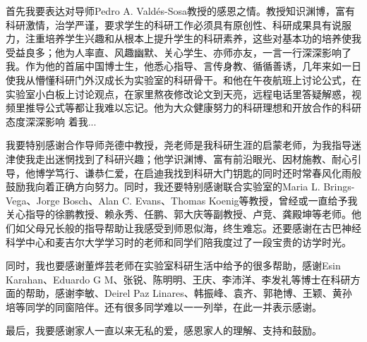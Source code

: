 \thesisacknowledgement
首先我要表达对导师Pedro A. Valdés-Sosa教授的感恩之情。教授知识渊博，富有科研激情，治学严谨，要求学生的科研工作必须具有原创性、科研成果具有说服力，注重培养学生兴趣和从根本上提升学生的科研素养，这些对基本功的培养使我受益良多；他为人率直、风趣幽默、关心学生、亦师亦友，一言一行深深影响了我。作为他的首届中国博士生，他悉心指导、言传身教、循循善诱，几年来如一日使我从懵懂科研门外汉成长为实验室的科研骨干。和他在午夜航班上讨论公式，在实验室小白板上讨论观点，在家里熬夜修改论文到天亮，远程电话里答疑解惑，视频里推导公式等都让我难以忘记。他为大众健康努力的科研理想和开放合作的科研态度深深影响
着我...

我要特别感谢合作导师尧德中教授，尧老师是我科研生涯的启蒙老师，为我指导迷津使我走出迷惘找到了科研兴趣；他学识渊博、富有前沿眼光、因材施教、耐心引导，他博学笃行、谦恭仁爱，在启迪我找到科研大门钥匙的同时还时常春风化雨般鼓励我向着正确方向努力。同时，我还要特别感谢联合实验室的Maria L. Brings-Vega、Jorge Bosch、Alan C. Evans、Thomas Koenig等教授，曾经或一直给予我关心指导的徐鹏教授、赖永秀、任鹏、郭大庆等副教授、卢竞、龚殿坤等老师。他们如父母兄长般的指导帮助让我感受到师恩似海，终生难忘。还要感谢在古巴神经科学中心和麦吉尔大学学习时的老师和同学们陪我度过了一段宝贵的访学时光。

同时，我也要感谢董烨芸老师在实验室科研生活中给予的很多帮助，感谢Esin Karahan、Eduardo G M、张锐、陈明明、王庆、李沛洋、李发礼等博士在科研方面的帮助，感谢李敏、Deirel Paz Linares、韩振峰、袁齐、郭艳博、王颖、黄孙培等同学的同窗陪伴。还有很多同学难以一一列举，在此一并表示感谢。

最后，我要感谢家人一直以来无私的爱，感恩家人的理解、支持和鼓励。